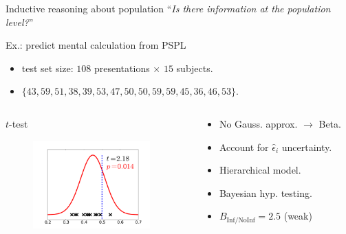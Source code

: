 \documentclass{beamer}
\begin{document}
\begin{frame}{Inductive reasoning about population}
  ``\emph{Is there information at the population level?}''
  \begin{block}{Ex.: predict mental calculation from PSPL
      ~\cite{knops2009recruitment}}
    \begin{itemize}
    \item test set size: $108$ presentations $\times$ $15$ subjects.
    \item $\{ 43, 59, 51, 38, 39,  53, 47, 50, 50, 59, 59, 45, 36, 46,
      53 \}$.
    \end{itemize}
  \end{block}
  \begin{columns}[T]
    \begin{column}{5.5cm}
      \begin{block}{$t$-test}
        \begin{figure}
          \includegraphics[width=4.5cm]{knops}
        \end{figure}
      \end{block}
    \end{column}
    \begin{column}{5.5cm}
      \begin{block}{\cite{olivetti2011bayesian}}
        \begin{itemize}
        \item No Gauss. approx. $\rightarrow$ Beta.
        \item Account for $\hat{\epsilon}_i$ uncertainty.
        \item Hierarchical model.
        \item Bayesian hyp. testing.
        \item \alert{$B_{\text{Inf}/\text{NoInf}}=2.5$} (weak)
        \end{itemize}
      \end{block}
    \end{column}
  \end{columns}
\end{frame}



%   


\end{document}
